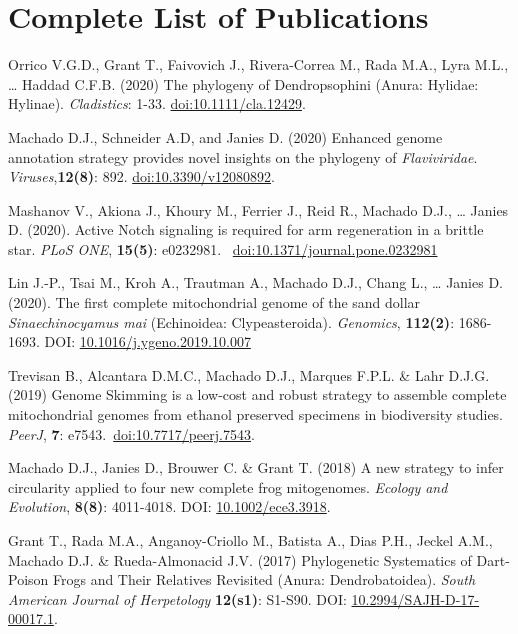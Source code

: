
\section{Complete List of Publications}

	{
		\setlength{\parskip}{.5em}\renewcommand{\baselinestretch}{2.0}
		\begin{hangparas}{.25in}{1}

        Orrico V.G.D., Grant T., Faivovich J., Rivera-Correa M., Rada M.A., Lyra M.L., … Haddad C.F.B. (2020) The phylogeny of Dendropsophini (Anura: Hylidae: Hylinae). \emph{Cladistics}: 1-33. \href{https://onlinelibrary.wiley.com/doi/abs/10.1111/cla.12429}{doi:10.1111/cla.12429}.

        Machado D.J., Schneider A.D, and Janies D. (2020) Enhanced genome annotation strategy provides novel insights on the phylogeny of \emph{Flaviviridae}. \emph{Viruses},\textbf{12(8)}: 892. \href{https://www.mdpi.com/1999-4915/12/8/892}{doi:10.3390/v12080892}.
	
	    Mashanov V., Akiona J., Khoury M., Ferrier J., Reid R., Machado D.J., … Janies D. (2020). Active Notch signaling is required for arm regeneration in a brittle star. \emph{PLoS ONE}, \textbf{15(5)}: e0232981. ~\href{https://doi.org/10.1371/journal.pone.0232981}{doi:10.1371/journal.pone.0232981}
	    
	    Lin J.-P., Tsai M., Kroh A., Trautman A., Machado D.J., Chang L., … Janies D. (2020). The first complete mitochondrial genome of the sand dollar \emph{Sinaechinocyamus mai} (Echinoidea: Clypeasteroida). \emph{Genomics}, \textbf{112(2)}: 1686-1693. DOI: \href{https://doi.org/10.1016/j.ygeno.2019.10.007}{10.1016/j.ygeno.2019.10.007}
	
		Trevisan B., Alcantara D.M.C., Machado D.J., Marques F.P.L. \& Lahr D.J.G. (2019) Genome Skimming is a low-cost and robust strategy to assemble complete mitochondrial genomes from ethanol preserved specimens in biodiversity studies. \emph{PeerJ}, \textbf{7}: e7543.~\href{https://doi.org/10.7717/peerj.7543}{doi:10.7717/peerj.7543}.

		Machado D.J., Janies D., Brouwer C. \& Grant T. (2018) A new strategy to infer circularity applied to four new complete frog mitogenomes. \emph{Ecology and Evolution}, \textbf{8(8)}: 4011-4018. DOI: \href{http://doi.wiley.com/10.1002/ece3.3918}{10.1002/ece3.3918}.

		Grant T., Rada M.A., Anganoy-Criollo M., Batista A., Dias P.H., Jeckel A.M., Machado D.J. \& Rueda-Almonacid J.V. (2017) Phylogenetic Systematics of Dart-Poison Frogs and Their Relatives Revisited (Anura: Dendrobatoidea). \emph{South American Journal of Herpetology} \textbf{12(s1)}: S1-S90. DOI: \href{http://www.bioone.org/doi/10.2994/SAJH-D-17-00017.1}{10.2994/SAJH-D-17-00017.1}.


\end{hangparas}}
